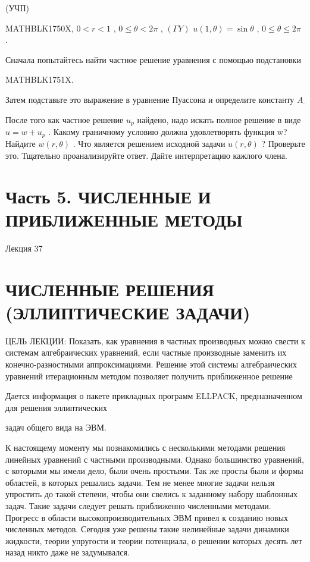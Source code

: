 \documentclass[
]{article}
\begin{document}
(УЧП)

MATHBLK1750X, \(0 < r < 1\) , \(0 \le \theta < 2\pi\) , \((\Gamma Y)\)
\(u(1, \theta) = \sin \theta\) , \(0 \le \theta \le 2\pi\) .

Сначала попытайтесь найти частное решение уравнения с помощью
подстановки

MATHBLK1751X.

Затем подставьте это выражение в уравнение Пуассона и определите
константу \(A_{\cdot}\)

После того как частное решение \(u_p\) найдено, надо искать полное
решение в виде \(u=w+u_p\) . Какому граничному условию должна
удовлетворять функция w? Найдите \(w(r, \theta)\) . Что является
решением исходной задачи \(u(r, \theta)\) ? Проверьте это. Тщательно
проанализируйте ответ. Дайте интерпретацию кажлого члена.

\section{Часть 5. ЧИСЛЕННЫЕ И ПРИБЛИЖЕННЫЕ
МЕТОДЫ}\label{ux447ux430ux441ux442ux44c-5.-ux447ux438ux441ux43bux435ux43dux43dux44bux435-ux438-ux43fux440ux438ux431ux43bux438ux436ux435ux43dux43dux44bux435-ux43cux435ux442ux43eux434ux44b}

Лекция 37

\section{ЧИСЛЕННЫЕ РЕШЕНИЯ (ЭЛЛИПТИЧЕСКИЕ
ЗАДАЧИ)}\label{ux447ux438ux441ux43bux435ux43dux43dux44bux435-ux440ux435ux448ux435ux43dux438ux44f-ux44dux43bux43bux438ux43fux442ux438ux447ux435ux441ux43aux438ux435-ux437ux430ux434ux430ux447ux438}

ЦЕЛЬ ЛЕКЦИИ: Показать, как уравнения в частных производных можно свести
к системам алгебраических уравнений, если частные производные заменить
их конечно-разностными аппроксимациями. Решение этой системы
алгебраических уравнений итерационным методом позволяет получить
приближенное решение

Дается информация о пакете прикладных программ ELLPACK, предназначенном
для решения эллиптических

задач общего вида на ЭВМ.

К настоящему моменту мы познакомились с несколькими методами решения
линейных уравнений с частными производными. Однако большинство
уравнений, с которыми мы имели дело, были очень простыми. Так же просты
были и формы областей, в которых решались задачи. Тем не менее многие
задачи нельзя упростить до такой степени, чтобы они свелись к заданному
набору шаблонных задач. Такие задачи следует решать приближенно
численными методами. Прогресс в области высокопроизводительных ЭВМ
привел к созданию новых численных методов. Сегодня уже решены такие
нелинейные задачи динамики жидкости, теории упругости и теории
потенциала, о решении которых десять лет назад никто даже не
задумывался.
\end{document}
